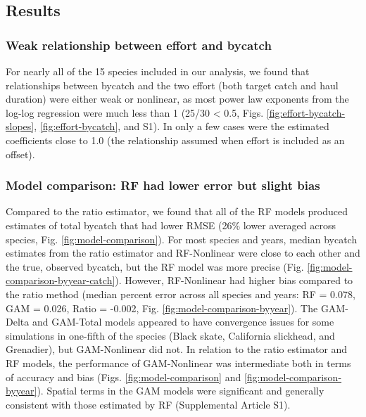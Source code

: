 \documentclass[]{article}
\begin{document}
\subsection{Results}\label{results}

\subsubsection{Weak relationship between effort and
bycatch}\label{weak-relationship-between-effort-and-bycatch}

For nearly all of the 15 species included in our analysis, we found that
relationships between bycatch and the two effort (both target catch and
haul duration) were either weak or nonlinear, as most power law
exponents from the log-log regression were much less than 1 (25/30
\textless{} 0.5, Figs. \ref{fig:effort-bycatch-slopes},
\ref{fig:effort-bycatch}, and S1). In only a few cases were the
estimated coefficients close to 1.0 (the relationship assumed when
effort is included as an offset).

\subsubsection{Model comparison: RF had lower error but slight
bias}\label{model-comparison-rf-had-lower-error-but-slight-bias}

Compared to the ratio estimator, we found that all of the RF models
produced estimates of total bycatch that had lower RMSE (26\% lower
averaged across species, Fig. \ref{fig:model-comparison}). For most
species and years, median bycatch estimates from the ratio estimator and
RF-Nonlinear were close to each other and the true, observed bycatch,
but the RF model was more precise (Fig.
\ref{fig:model-comparison-byyear-catch}). However, RF-Nonlinear had
higher bias compared to the ratio method (median percent error across
all species and years: RF = 0.078, GAM = 0.026, Ratio = -0.002, Fig.
\ref{fig:model-comparison-byyear}). The GAM-Delta and GAM-Total models
appeared to have convergence issues for some simulations in one-fifth of
the species (Black skate, California slickhead, and Grenadier), but
GAM-Nonlinear did not. In relation to the ratio estimator and RF models,
the performance of GAM-Nonlinear was intermediate both in terms of
accuracy and bias (Figs. \ref{fig:model-comparison} and
\ref{fig:model-comparison-byyear}). Spatial terms in the GAM models were
significant and generally consistent with those estimated by RF
(Supplemental Article S1).
\end{document}
